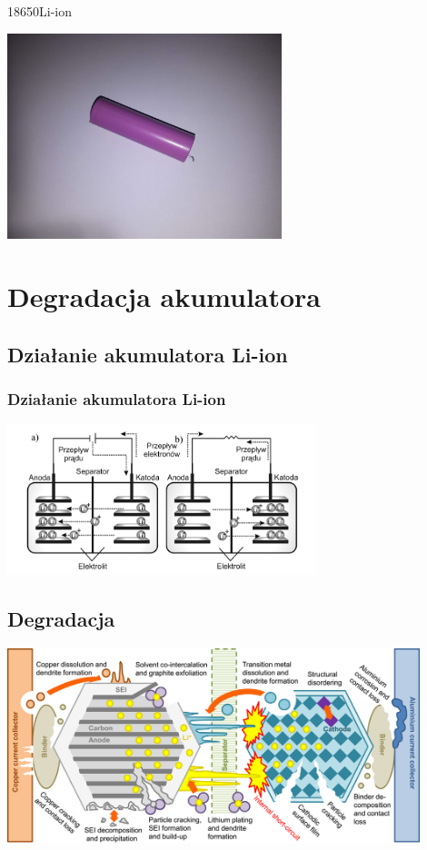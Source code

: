 \documentclass[
	11pt, %
]{beamer}
\begin{document}
\begin{frame}{18650}{Li-ion}

  \centering
  \includegraphics[width=8cm]{18650.jpg}
\end{frame}

\section{Degradacja akumulatora}

\subsection{Działanie akumulatora Li-ion}

\begin{frame}
	\frametitle{Działanie akumulatora Li-ion}
	\centering
	\includegraphics[width=9cm]{liion.png}\cite{m14}
\end{frame}

\subsection{Degradacja}

\begin{frame}
  \centering
	\includegraphics[width=12cm]{degradation-all.jpg}\cite{b17}
\end{frame}
\end{document}
